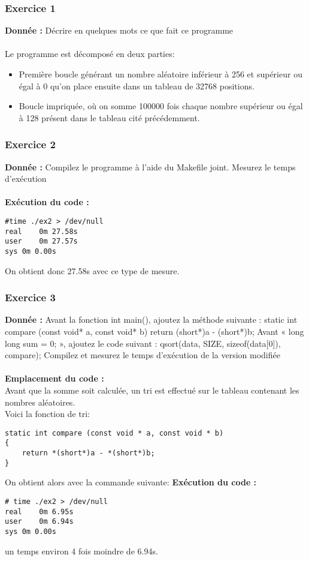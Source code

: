 \subsubsection{Exercice 1}
\textbf{Donnée : } Décrire	en	quelques	mots	ce	que	fait	ce	programme\\\\
Le programme est décomposé en deux parties:
\begin{itemize}
\item Première boucle générant un nombre aléatoire inférieur à 256 et supérieur ou égal à 0 qu'on place ensuite dans un tableau de 32768 positions.
\item Boucle impriquée, où on somme 100000 fois chaque nombre supérieur ou égal à 128 présent dans le tableau cité précédemment.
\end{itemize}
\subsubsection{Exercice 2}
\textbf{Donnée : } Compilez	le	programme	à	l'aide	du	Makefile	joint.
Mesurez	le	temps	d'exécution\\\\

\textbf{Exécution du code : } \\
\begin{lstlisting}
#time ./ex2 > /dev/null
real    0m 27.58s
user    0m 27.57s
sys 0m 0.00s
\end{lstlisting}
On obtient donc 27.58s avec ce type de mesure.
\subsubsection{Exercice 3}
\textbf{Donnée : } Avant	la	fonction	int	main(),	ajoutez	la	méthode	suivante :
static int compare (const void* a, const void* b)
{return (short*)a - (short*)b;}
Avant	« long	long	sum	=	0; »,	ajoutez	le	code	suivant :
qsort(data, SIZE, sizeof(data[0]), compare);
Compilez	et	mesurez	le	temps	d'exécution	de	la	version	modifiée\\\\
\textbf{Emplacement du code : } \textit{}\\
Avant que la somme soit calculée, un tri est effectué sur le tableau contenant les nombres aléatoires.\\
Voici la fonction de tri:
\begin{lstlisting}
static int compare (const void * a, const void * b)
{
    return *(short*)a - *(short*)b;
}
\end{lstlisting}
On obtient alors avec la commande suivante:
\textbf{Exécution du code : } \\
\begin{lstlisting}
# time ./ex2 > /dev/null 
real    0m 6.95s
user    0m 6.94s
sys 0m 0.00s
\end{lstlisting}
un temps environ 4 fois moindre de 6.94s.

